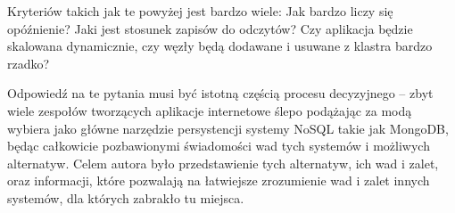 Kryteriów takich jak te powyżej jest bardzo wiele: 
Jak bardzo liczy się opóźnienie? 
Jaki jest stosunek zapisów do odczytów? 
Czy aplikacja będzie skalowana dynamicznie, czy węzły będą dodawane i usuwane z klastra bardzo rzadko?

Odpowiedź na te pytania musi być istotną częścią procesu decyzyjnego -- zbyt wiele zespołów tworzących aplikacje internetowe ślepo podążając za modą wybiera jako główne narzędzie persystencji systemy NoSQL takie jak MongoDB, będąc całkowicie pozbawionymi świadomości wad tych systemów i możliwych alternatyw.
Celem autora było przedstawienie tych alternatyw, ich wad i zalet, oraz informacji, które pozwalają na łatwiejsze zrozumienie wad i zalet innych systemów, dla których zabrakło tu miejsca.